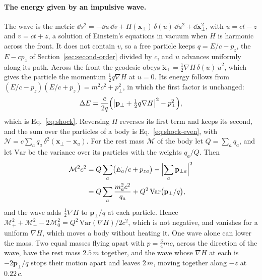\paragraph{The energy given by an impulsive wave.} The wave is the metric
$\dd s^2 = -\dd u\,\dd v + H(\mathbf x_\perp)\,\delta(u)\,\dd u^2 + \dd\mathbf x_\perp^2$,
with $u = ct - z$ and $v = ct + z$, a solution of Einstein's equations in
vacuum when $H$ is harmonic across the front. It does not contain $v$, so a
free particle keeps $q = E/c - p_z$, the $E - cp_z$ of
Section~\ref{sec:second-order} divided by $c$, and $u$ advances uniformly along its
path. Across the front the geodesic obeys
$\ddot{\mathbf x}_\perp = \tfrac12\nabla H\,\delta(u)\,\dot u^2$, which gives
the particle the momentum $\tfrac12q\nabla H$ at $u = 0$. Its energy follows
from $(E/c - p_z)(E/c + p_z) = m^2c^2 + p_\perp^2$, in which the first factor
is unchanged:
\begin{equation}\label{eq:proof-shock}
\Delta E = \frac{c}{2q}\Bigl(\bigl|\mathbf p_\perp + \tfrac12q\nabla H\bigr|^2
- p_\perp^2\Bigr) ,
\end{equation}
which is Eq.~\eqref{eq:shock}. Reversing $H$ reverses its first term and
keeps its second, and the sum over the particles of a body is
Eq.~\eqref{eq:shock-even}, with
$\mathcal N = c\sum_a q_a\,\delta^2(\mathbf x_\perp - \mathbf x_a)$. For the rest mass
$\mathcal M$ of the body let $Q = \sum_a q_a$, and let $\mathrm{Var}$ be the
variance over its particles with the weights $q_a/Q$. Then
\begin{equation}\label{eq:proof-mass}
\begin{aligned}
\mathcal M^2c^2 &= Q\sum_a\bigl(E_a/c + p_{za}\bigr)
- \Bigl|\sum_a\mathbf p_{\perp a}\Bigr|^2\\
&= Q\sum_a\frac{m_a^2c^2}{q_a}
+ Q^2\,\mathrm{Var}\bigl(\mathbf p_\perp/q\bigr) ,
\end{aligned}
\end{equation}
and the wave adds $\tfrac12\nabla H$ to $\mathbf p_\perp/q$ at each particle.
Hence
$\mathcal M_+^2 + \mathcal M_-^2 - 2\mathcal M_0^2 = Q^2\,\mathrm{Var}(\nabla H)/2c^2$,
which is not negative, and vanishes for a uniform $\nabla H$, which moves a
body without heating it. One wave alone can lower the mass. Two equal masses
flying apart with $p = \tfrac34mc$, across the direction of the wave, have the
rest mass $2.5\,m$ together, and the wave whose $\nabla H$ at each is
$-2\mathbf p_\perp/q$ stops their motion apart and leaves $2\,m$, moving
together along $-z$ at $0.22\,c$.

